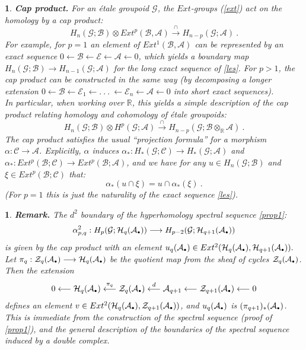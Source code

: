 \documentclass[a4paper]{article}
\newtheorem{num}[st]{}
\newcommand{\rmap}{\longrightarrow}
\newcommand{\lmap}{\longleftarrow}
\newcommand{\Ha}{\ensuremath{\mathcal{H}}}
\newcommand{\G}{\ensuremath{\mathcal{G}}}
\newcommand{\A}{\ensuremath{\mathcal{A}}}
\newcommand{\E}{\ensuremath{\mathcal{E}}}
\newcommand{\B}{\ensuremath{\mathcal{B}}}
\newcommand{\C}{\ensuremath{\mathcal{C}}}
\newcommand{\Z}{\ensuremath{\mathcal{Z}}}
\def\cdot{{\raise 0.5pt\hbox{$\scriptscriptstyle\bullet$}}}
\begin{document}
\begin{num}
\label{cap}
\emph{
{\bf Cap product.} For an \'etale groupoid $\G$, the $Ext$-groups (\ref{ext}) act on the homology by a cap product:
\begin{equation}
\label{rel4.7}
 H_{n}(\G; \B) \otimes Ext^{p}(\B, \A) \stackrel{\cap}{\rmap} H_{n-p}(\G; \A)\ .
\end{equation}
\hspace*{.3in} For example, for $p=1$ an element of $Ext^{1}(\B, \A)$ can be represented by an exact sequence $0 \lmap \B \lmap \E \lmap \A \lmap 0$, which yields a boundary map $H_{n}(\G; \B) \rmap H_{n-1}(\G; \A)$ for the long exact sequence of \ref{les}. For $p > 1$, the cap product can be constructed in the same way (by decomposing a longer extension $0 \lmap \B \lmap \E_{1} \lmap .\ .\ .\ \lmap \E_{n} \lmap \A \lmap 0$ into short exact sequences). \\
\hspace*{.3in} In particular, when working over $\mathbb{R}$, this yields a simple description of the cap product relating homology and cohomology of \'etale groupoids:
\[ H_{n}(\G; \B) \otimes H^{p}(\G; \A) \stackrel{\cap}{\rmap} H_{n-p}(\G; \B\otimes_{\mathbb{R}} \A)\ .\]
\hspace*{.3in} The cap product satisfies the usual ``projection formula'' for a morphism $\alpha: \C \rmap \A$. Explicitly, $\alpha$ induces $\alpha_{*}: H_{*}(\G; \C) \rmap H_{*}(\G; \A)$ and $\alpha_{*}: Ext^{p}(\B; \C) \rmap Ext^{p}(\B; \A)$, and we have for any $u \in H_{n}(\G; \B)$ and $\xi \in Ext^{p}(\B; \C)$ that:
\[ \alpha_{*}(u \cap\xi) = u \cap\alpha_{*}(\xi)\ .\]
(For $p= 1$ this is just the naturality of the exact sequence \ref{les}).
}
\end{num}



\begin{num}
\emph{
{\bf Remark.} The $d^{2}$ boundary of the hyperhomology spectral sequence \ref{prop1}:
\[ \alpha_{p,q}^{2}: H_{p}(\G; \Ha_{q}(\A_{\cdot})) \rmap H_{p-2}(\G; \Ha_{q+1}(\A_{\cdot})) \]
is given by the cap product with an element $u_{q}(\A_{\cdot}) \in Ext^{2}(\Ha_{q}(\A_{\cdot}), \Ha_{q+1}(\A_{\cdot})).$ Let $\pi_{q}: \Z_{q}(\A_{\cdot}) \rmap  \Ha_{q}(\A_{\cdot})$ be the quotient map from the sheaf of cycles $\Z_{q}(\A_{\cdot})$. Then the extension 
\[ 0 \lmap \Ha_{q}(\A_{\cdot}) \stackrel{\pi_{q}}{\lmap} \Z_{q}(\A_{\cdot}) \stackrel{d}{\lmap} \A_{q+1} \lmap \Z_{q+1}(\A_{\cdot}) \lmap 0 \]
defines an element $v \in Ext^{2}(\Ha_{q}(\A_{\cdot}), \Z_{q+1}(\A_{\cdot}))$, and $u_{q}(\A_{\cdot})$ is $(\pi_{q+1})_{*}(\A_{\cdot})$. This is immediate from the construction of the spectral sequence (proof of \ref{prop1}), and the general description of the boundaries of the spectral sequence induced by a double complex.
}
\end{num}
\end{document}
